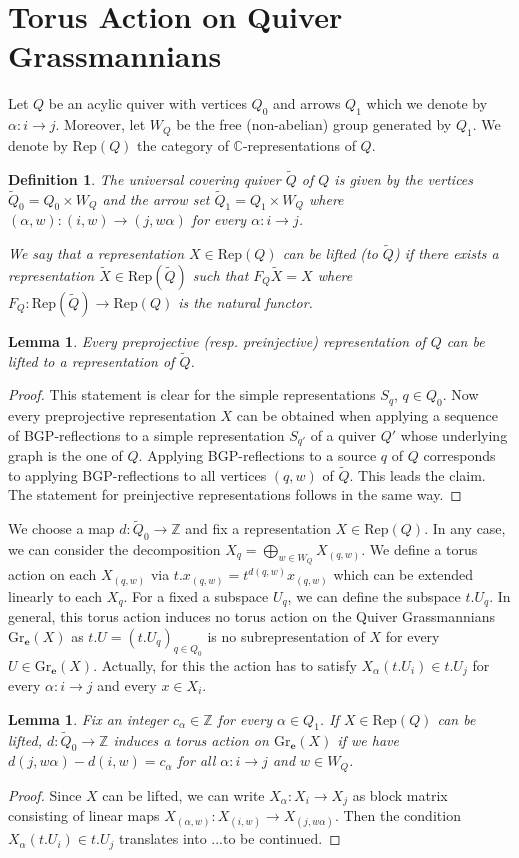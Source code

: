 \documentclass{amsart}
\newtheorem{definition}[theorem]{Definition}
\newtheorem{lemma}[theorem]{Lemma}
\newcommand{\bfe}{\mathbf{e}}
\newcommand{\C}{\mathbb{C}}
\newcommand{\Rep}{\mathrm{Rep}}
\newcommand{\Gr}{\mathrm{Gr}}
\newcommand{\ZZ}{\mathbb{Z}}
\begin{document}
\section{Torus Action on Quiver Grassmannians}
\noindent Let $Q$ be an acylic quiver with vertices $Q_0$ and arrows $Q_1$ which we denote by $\alpha:i\to j$. Moreover, let $W_{Q}$ be the free (non-abelian) group generated by $Q_1$.  We denote by $\Rep(Q)$ the category of $\C$-representations of $Q$.
\begin{definition}
The universal covering quiver $\tilde Q$ of $Q$ is given by the vertices $\tilde Q_0=Q_0\times W_{Q}$ and the arrow set $\tilde Q_1=Q_1\times W_{Q}$ where $(\alpha,w):(i,w)\to (j,w\alpha)$ for every $\alpha:i\to j$.

We say that a representation $X\in \Rep(Q)$ can be lifted (to $\tilde Q$) if there exists a representation $\tilde X\in\Rep(\tilde Q)$ such that $F_Q\tilde X=X$ where $F_Q:\Rep(\tilde Q)\to\Rep(Q)$ is the natural functor.
\end{definition}
\begin{lemma}
  Every preprojective (resp. preinjective) representation of $Q$ can be lifted to a representation of $\tilde Q$.
\end{lemma}
\begin{proof}This statement is clear for the simple representations $S_q$, $q\in Q_0$. Now every preprojective representation $X$ can be obtained when applying a sequence of BGP-reflections \cite{bgp} to a simple representation $S_{q'}$ of a quiver $Q'$ whose underlying graph is the one of $Q$. Applying BGP-reflections to a source $q$ of $Q$ corresponds to applying BGP-reflections to all vertices $(q,w)$ of $\tilde Q$. This leads the claim. The statement for preinjective representations follows in the same way.
\end{proof}
We choose a map $d:\tilde Q_0\to\ZZ$ and fix a representation $X\in\Rep(Q)$. In any case, we can consider the decomposition $X_q=\bigoplus_{w\in W_Q} X_{(q,w)}$. We define a torus action on each $X_{(q,w)}$ via $t.x_{(q,w)}=t^{d(q,w)}x_{(q,w)}$ which can be extended linearly to each $X_q$. For a fixed a subspace $U_q$, we can define the subspace $t.U_q$. In general, this torus action induces no torus action on the Quiver Grassmannians $\Gr_{\bfe}(X)$ as $t.U=(t.U_q)_{q\in Q_0}$ is no subrepresentation of $X$ for every $U\in \Gr_{\bfe}(X)$. Actually, for this the action has to satisfy $X_{\alpha}(t.U_i)\in t.U_j$ for every $\alpha:i\to j$ and every $x\in X_i$. 
\begin{lemma}Fix an integer $c_\alpha\in\ZZ$ for every $\alpha\in Q_1$.
If $X\in\Rep(Q)$ can be lifted, $d:\tilde Q_0\to\ZZ$ induces a torus action on $\Gr_\bfe(X)$ if we have $d(j,w\alpha)-d(i,w)=c_\alpha$ for all $\alpha:i\to j$ and $w\in W_{Q}$.
\end{lemma}
\begin{proof} Since $X$ can be lifted, we can write $X_\alpha:X_i\to X_j$ as block matrix consisting of linear maps $X_{(\alpha,w)}:X_{(i,w)}\to X_{(j,w\alpha)}$. Then the condition $X_{\alpha}(t.U_i)\in t.U_j$ translates into ...to be continued.
\end{proof}
\end{document}
